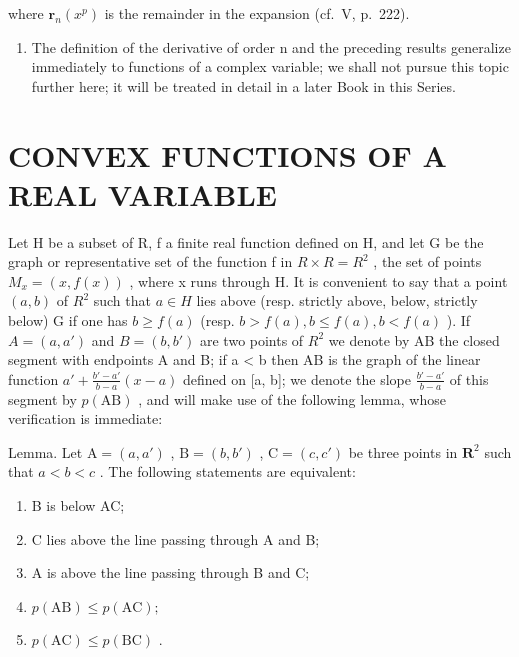 where \(\mathbf{r}_{n}(x^{p})\) is the remainder in the expansion (cf.~V, p.~222).

\begin{enumerate}
\def\labelenumi{\arabic{enumi})}
\setcounter{enumi}{2}
\tightlist
\item
  The definition of the derivative of order n and the preceding results generalize immediately to functions of a complex variable; we shall not pursue this topic further here; it will be treated in detail in a later Book in this Series.
\end{enumerate}

\section{CONVEX FUNCTIONS OF A REAL VARIABLE}

Let H be a subset of R, f a finite real function defined on H, and let G be the graph or representative set of the function f in \(R \times R = R^{2}\) , the set of points \(M_{x} = (x, f(x))\) , where x runs through H. It is convenient to say that a point \((a, b)\) of \(R^{2}\) such that \(a \in H\) lies above (resp. strictly above, below, strictly below) G if one has \(b \geqslant f(a)\) (resp. \(b > f(a), b \leqslant f(a), b < f(a)\) ). If \(A = (a, a')\) and \(B = (b, b')\) are two points of \(R^{2}\) we denote by AB the closed segment with endpoints A and B; if a \textless{} b then AB is the graph of the linear function \(a' + \frac{b' - a'}{b - a} (x - a)\) defined on {[}a, b{]}; we denote the slope \(\frac{b' - a'}{b - a}\) of this segment by \(p(\text{AB})\) , and will make use of the following lemma, whose verification is immediate:

Lemma. Let \(\mathrm{A} = (a, a')\) , \(\mathrm{B} = (b, b')\) , \(\mathrm{C} = (c, c')\) be three points in \(\mathbf{R}^2\) such that \(a < b < c\) . The following statements are equivalent:

\begin{enumerate}
\def\labelenumi{\alph{enumi})}
\item
  B is below AC;
\item
  C lies above the line passing through A and B;
\item
  A is above the line passing through B and C;
\item
  \(p(\mathrm{AB}) \leqslant p(\mathrm{AC});\)
\item
  \(p(\mathrm{AC}) \leqslant p(\mathrm{BC})\) .
\end{enumerate}

